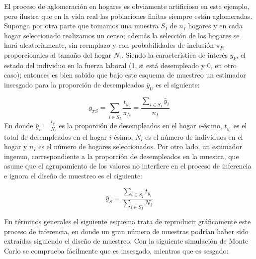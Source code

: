 \documentclass[
  12pt,
]{book}
\begin{document}
El proceso de aglomeración en hogares es obviamente artificioso en este ejemplo, pero ilustra que en la vida real las poblaciones finitas siempre están aglomeradas. Suponga por otra parte que tomamos una muestra \(S_{I}\) de \(n_{I}\) hogares y en cada hogar seleccionado realizamos un censo; además la selección de los hogares se hará aleatoriamente, sin reemplazo y con probabilidades de inclusión \(\pi_{Ii}\) proporcionales
al tamaño del hogar \(N_{i}\). Siendo la característica de interés \(y_{k}\), el estado del individuo en la fuerza laboral (1, si está desempleado y 0, en otro caso); entonces es bien sabido que bajo este esquema de muestreo un estimador insesgado para la proporción de desempleados \(\bar{y}_{U}\) es el siguiente:

\[
\bar{y}_{\pi S}=\sum_{i\in S_{I}}\frac{t_{y_{i}}}{\pi_{Ii}}=\frac{\sum_{i\in S_{I}}\bar{y}_{i}}{n_{I}}
\]
En donde \(\bar{y}_{i}=\frac{t_{y_{i}}}{N_{i}}\) es la proporción de desempleados en el hogar \(i\)-ésimo, \(t_{y_{i}}\) es el total de desempleados en el hogar \(i\)-ésimo, \(N_{i}\) es el número de individuos en el hogar y \(n_{I}\) es el número de hogares seleccionados. Por otro lado, un estimador ingenuo, correspondiente a la proporción de desempleados
en la muestra, que asume que el agrupamiento de los valores no interfiere
en el proceso de inferencia e ignora el diseño de muestreo es el siguiente:

\[
\bar{y}_{S}=\frac{\sum_{i\in S_{I}}t_{y_{i}}}{\sum_{i\in S_{I}}N_{i}}
\]

En términos generales el siguiente esquema trata de reproducir gráficamente este proceso de inferencia, en donde un gran número de muestras podrían haber sido extraídas siguiendo el diseño de muestreo. Con la siguiente simulación de Monte Carlo se comprueba fácilmente que es insesgado, mientras que es sesgado:
\end{document}
